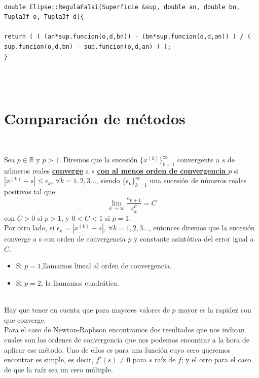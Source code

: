 \begin{lstlisting}[style=Consola]

double Elipse::RegulaFalsi(Superficie &sup, double an, double bn, Tupla3f o, Tupla3f d){

return ( ( (an*sup.funcion(o,d,bn)) - (bn*sup.funcion(o,d,an)) ) / ( sup.funcion(o,d,bn) - sup.funcion(o,d,an) ) );
}

\end{lstlisting}
${ }$\\




${ }$\\
\section{Comparación de métodos}
${ }$\\


\begin{definicion}
	Sea $p \in \mathbb{R}$ y $p > 1$. Diremos que la sucesión $\{ x^{(k)} \}^{\infty}_{k=1}$ convergente a $s$ de números reales \underline{\textbf{converge}} a $s$ \underline{\textbf{con al menos orden de convergencia $p$}} si $|x^{(k)} -s| \leq \epsilon_k$, $\forall k = 1,2,3...$, siendo $\{ \epsilon_k \}^{\infty}_{k=1}$ una sucesión de números reales positivos tal que
	\[
		\lim_{k \to \infty} \frac{\epsilon_{k+1}}{\epsilon^{p}_{k}} = C
	\]
	con $C > 0$ si $p > 1$, y $0 < C < 1$ si $p = 1$.
	${ }$\\
	
	Por otro lado, si $\epsilon_k = |x^{(k)} -s|$, $\forall k = 1,2,3...$, entonces diremos que la sucesión converge a s con orden de convergencia $p$ y constante asintótica del error igual a $C$.
	\begin{itemize}
		\item Si $p=1$,llamamos lineal al orden de convergencia.
		\item Si $p=2$, la llamamos cuadrática.
	\end{itemize}
\end{definicion}
${ }$\\

Hay que tener en cuenta que para mayores valores de $p$ mayor es la rapidez con que converge.
${ }$\\

Para el caso de Newton-Raphson encontramos dos resultados que nos indican cuales son los ordenes de convergencia que nos podemos encontrar a la hora de aplicar ese método. Uno de ellos es para una función cuyo cero queremos encontrar es simple, es decir, $f'(s) \neq 0$ para $s$ raíz de $f$; y el otro para el caso de que la raíz sea un cero múltiple.
${ }$\\

